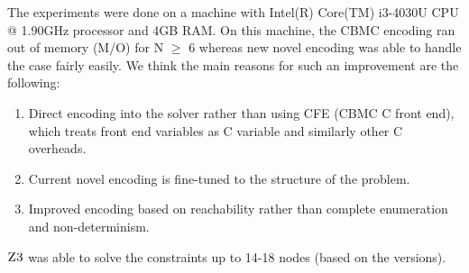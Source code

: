 

The experiments were done on a machine with Intel(R) Core(TM) i3-4030U CPU @ 1.90GHz processor and 4GB RAM. On this machine, the CBMC encoding ran out of memory (M/O) for N $\geq$ 6 whereas new novel encoding was able to handle the case fairly easily. We think the main reasons for such an improvement are the following:
\begin{enumerate}
\item Direct encoding into the solver rather than using CFE (CBMC C front end), which treats front end variables as C variable and similarly other C overheads.
\item Current novel encoding is fine-tuned to the structure of the problem.
\item Improved encoding based on reachability rather than complete enumeration and non-determinism.
\end{enumerate} 
% 
$\textsc{Z3}$ was able to solve the constraints up to 14-18 nodes (based on the versions).
%


